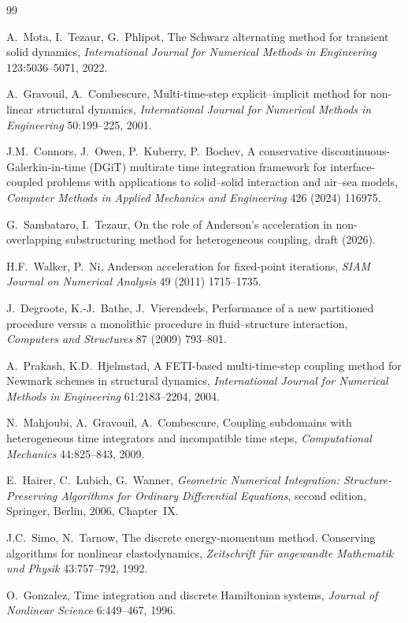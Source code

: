 \documentclass[11pt]{article}
\begin{document}
\begin{thebibliography}{99}

A.~Mota, I.~Tezaur, G.~Phlipot,
The Schwarz alternating method for transient solid dynamics,
\emph{International Journal for Numerical Methods in Engineering}
123:5036--5071, 2022.

A.~Gravouil, A.~Combescure,
Multi-time-step explicit--implicit method for non-linear structural
dynamics,
\emph{International Journal for Numerical Methods in Engineering}
50:199--225, 2001.

J.M.~Connors, J.~Owen, P.~Kuberry, P.~Bochev,
A conservative discontinuous-Galerkin-in-time (DGiT) multirate time
integration framework for interface-coupled problems with applications to
solid--solid interaction and air--sea models, \emph{Computer Methods in
Applied Mechanics and Engineering}
426 (2024) 116975.

G.~Sambataro, I.~Tezaur, On the role of Anderson's acceleration in
non-overlapping substructuring method for heterogeneous coupling, draft
(2026).

H.F.~Walker, P.~Ni, Anderson acceleration for fixed-point iterations,
\emph{SIAM Journal on Numerical Analysis} 49 (2011) 1715--1735.

J.~Degroote, K.-J.~Bathe, J.~Vierendeels, Performance of a new
partitioned procedure versus a monolithic procedure in fluid--structure
interaction, \emph{Computers and Structures} 87 (2009) 793--801.

A.~Prakash, K.D.~Hjelmstad,
A FETI-based multi-time-step coupling method for Newmark schemes in
structural dynamics,
\emph{International Journal for Numerical Methods in Engineering}
61:2183--2204, 2004.

N.~Mahjoubi, A.~Gravouil, A.~Combescure,
Coupling subdomains with heterogeneous time integrators and incompatible
time steps,
\emph{Computational Mechanics} 44:825--843, 2009.

E.~Hairer, C.~Lubich, G.~Wanner,
\emph{Geometric Numerical Integration: Structure-Preserving Algorithms for
Ordinary Differential Equations}, second edition, Springer, Berlin, 2006,
Chapter~IX.

J.C.~Simo, N.~Tarnow,
The discrete energy-momentum method. Conserving algorithms for nonlinear
elastodynamics,
\emph{Zeitschrift f\"ur angewandte Mathematik und Physik} 43:757--792,
1992.

O.~Gonzalez,
Time integration and discrete Hamiltonian systems,
\emph{Journal of Nonlinear Science} 6:449--467, 1996.

\end{thebibliography}
\end{document}
